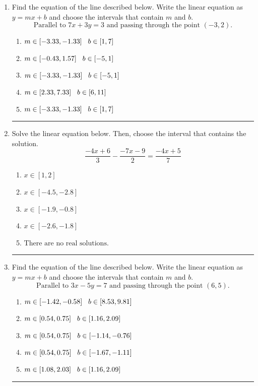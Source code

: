 \documentclass[14pt]{extbook}
\newcommand{\litem}[1]{\item#1\hspace*{-1cm}\rule{\textwidth}{0.4pt}}
\begin{document}
\begin{enumerate}
{\begin{enumerate}[label=\Alph*.]
\end{enumerate} }
\litem{
Find the equation of the line described below. Write the linear equation as $ y=mx+b $ and choose the intervals that contain $m$ and $b$.\[ \text{Parallel to } 7 x + 3 y = 3 \text{ and passing through the point } (-3, 2). \]\begin{enumerate}[label=\Alph*.]
\item \( m \in [-3.33, -1.33] \hspace*{3mm} b \in [1, 7] \)
\item \( m \in [-0.43, 1.57] \hspace*{3mm} b \in [-5, 1] \)
\item \( m \in [-3.33, -1.33] \hspace*{3mm} b \in [-5, 1] \)
\item \( m \in [2.33, 7.33] \hspace*{3mm} b \in [6, 11] \)
\item \( m \in [-3.33, -1.33] \hspace*{3mm} b \in [1, 7] \)

\end{enumerate} }
\litem{
Solve the linear equation below. Then, choose the interval that contains the solution.\[ \frac{-4x + 6}{3} - \frac{-7x -9}{2} = \frac{-4x + 5}{7} \]\begin{enumerate}[label=\Alph*.]
\item \( x \in [1, 2] \)
\item \( x \in [-4.5, -2.8] \)
\item \( x \in [-1.9, -0.8] \)
\item \( x \in [-2.6, -1.8] \)
\item \( \text{There are no real solutions.} \)

\end{enumerate} }
\litem{
Find the equation of the line described below. Write the linear equation as $ y=mx+b $ and choose the intervals that contain $m$ and $b$.\[ \text{Parallel to } 3 x - 5 y = 7 \text{ and passing through the point } (6, 5). \]\begin{enumerate}[label=\Alph*.]
\item \( m \in [-1.42, -0.58] \hspace*{3mm} b \in [8.53, 9.81] \)
\item \( m \in [0.54, 0.75] \hspace*{3mm} b \in [1.16, 2.09] \)
\item \( m \in [0.54, 0.75] \hspace*{3mm} b \in [-1.14, -0.76] \)
\item \( m \in [0.54, 0.75] \hspace*{3mm} b \in [-1.67, -1.11] \)
\item \( m \in [1.08, 2.03] \hspace*{3mm} b \in [1.16, 2.09] \)

\end{enumerate} }
\end{enumerate}
\end{document}
